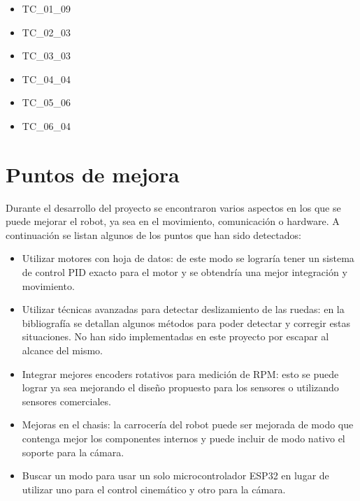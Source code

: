 \begin{itemize}
    \item TC\_01\_09
    \item TC\_02\_03
    \item TC\_03\_03
    \item TC\_04\_04
    \item TC\_05\_06
    \item TC\_06\_04
\end{itemize}


\section{Puntos de mejora}

Durante el desarrollo del proyecto se encontraron varios aspectos en los que se puede mejorar el robot, ya sea en el movimiento, comunicación o hardware. A continuación se listan algunos de los puntos que han sido detectados:

\begin{itemize}
    \item Utilizar motores con hoja de datos: de este modo se lograría tener un sistema de control PID exacto para el motor y se obtendría una mejor integración y movimiento.

    \item Utilizar técnicas avanzadas para detectar deslizamiento de las ruedas: en la bibliografía \cite{phunopasomnirobot} \cite{palacinodometry} se detallan algunos métodos para poder detectar y corregir estas situaciones. No han sido implementadas en este proyecto por escapar al alcance del mismo.
    
    \item Integrar mejores encoders rotativos para medición de RPM: esto se puede lograr ya sea mejorando el diseño propuesto para los sensores o utilizando sensores comerciales.
    
    \item Mejoras en el chasis: la carrocería del robot puede ser mejorada de modo que contenga mejor los componentes internos y puede incluir de modo nativo el soporte para la cámara.
    
    \item Buscar un modo para usar un solo microcontrolador ESP32 en lugar de utilizar uno para el control cinemático y otro para la cámara.
\end{itemize}
